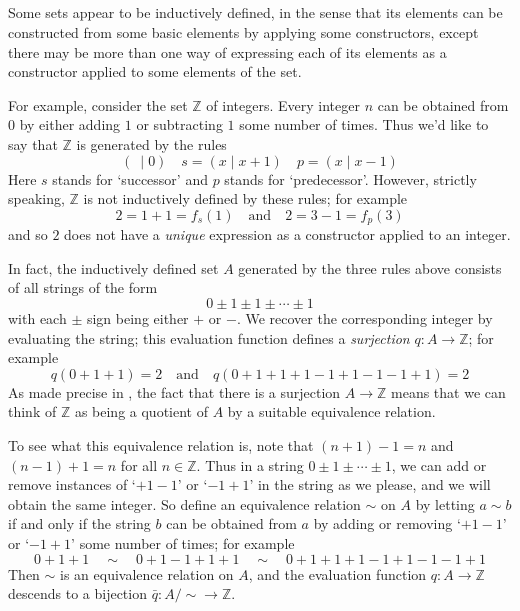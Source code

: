 \subsection*{}

Some sets appear to be inductively defined, in the sense that its elements can be constructed from some basic elements by applying some constructors, except there may be more than one way of expressing each of its elements as a constructor applied to some elements of the set.

For example, consider the set $\mathbb{Z}$ of integers. Every integer $n$ can be obtained from $0$ by either adding $1$ or subtracting $1$ some number of times. Thus we'd like to say that $\mathbb{Z}$ is generated by the rules
\[ (~ \mid 0) \quad s = (x \mid x+1) \quad p = (x \mid x-1) \]
Here $s$ stands for `successor' and $p$ stands for `predecessor'. However, strictly speaking, $\mathbb{Z}$ is not inductively defined by these rules; for example
\[ 2 = 1 + 1 = f_s(1) \quad \text{and} \quad 2 = 3 - 1 = f_p(3) \]
and so $2$ does not have a \textit{unique} expression as a constructor applied to an integer.

In fact, the inductively defined set $A$ generated by the three rules above consists of all strings of the form
\[ 0 \pm 1 \pm 1 \pm \cdots \pm 1 \]
with each $\pm$ sign being either $+$ or $-$. We recover the corresponding integer by evaluating the string; this evaluation function defines a \textit{surjection} $q : A \to \mathbb{Z}$; for example
\[ q(0+1+1) = 2 \quad \text{and} \quad q(0+1+1+1-1+1-1-1+1) = 2 \]
As made precise in , the fact that there is a surjection $A \to \mathbb{Z}$ means that we can think of $\mathbb{Z}$ as being a quotient of $A$ by a suitable equivalence relation.

To see what this equivalence relation is, note that $(n+1)-1 = n$ and $(n-1)+1=n$ for all $n \in \mathbb{Z}$. Thus in a string $0 \pm 1 \pm \cdots \pm 1$, we can add or remove instances of `$+1-1$' or `$-1+1$' in the string as we please, and we will obtain the same integer. So define an equivalence relation $\sim$ on $A$ by letting $a \sim b$ if and only if the string $b$ can be obtained from $a$ by adding or removing `$+1-1$' or `$-1+1$' some number of times; for example
\[ 0+1+1 \quad \sim \quad 0+1-1+1+1 \quad \sim \quad 0+1+1+1-1+1-1-1+1 \]
Then $\sim$ is an equivalence relation on $A$, and the evaluation function $q : A \to \mathbb{Z}$ descends to a bijection $\bar q : A/{\sim} \to \mathbb{Z}$.

